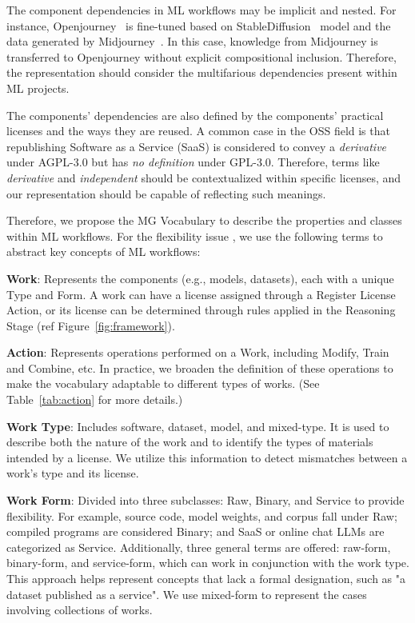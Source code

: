  The component dependencies in ML workflows may be implicit and nested. 
For instance, Openjourney~\cite{openjourney2024prompthero} is fine-tuned based on StableDiffusion~\cite{rombach2022high} model and the data generated by Midjourney~\cite{midjourney2024terms}. 
In this case, knowledge from Midjourney is transferred to Openjourney without explicit compositional inclusion. 
Therefore, the representation should consider the multifarious dependencies present within ML projects.

 The components' dependencies are also defined by the components' practical licenses and the ways they are reused. 
A common case in the OSS field is that republishing Software as a Service (SaaS) is considered to convey a \emph{derivative} under AGPL-3.0 but has \emph{no definition} under GPL-3.0. 
Therefore, terms like \emph{derivative} and \emph{independent} should be contextualized within specific licenses, and our representation should be capable of reflecting such meanings.

Therefore, we propose the MG Vocabulary to describe the properties and classes within ML workflows.
For the flexibility issue , we use the following terms to abstract key concepts of ML workflows:

\textbf{Work}: Represents the components (e.g., models, datasets), each with a unique Type and Form. 
A work can have a license assigned through a Register License Action, or its license can be determined through rules applied in the Reasoning Stage (ref Figure~\ref{fig:framework}).

\textbf{Action}: Represents operations performed on a Work, including Modify, Train and Combine, etc. 
In practice, we broaden the definition of these operations to make the vocabulary adaptable to different types of works. (See Table~\ref{tab:action} for more details.)

\textbf{Work Type}: Includes software, dataset, model, and mixed-type. It is used to describe both the nature of the work and to identify the types of materials intended by a license. 
We utilize this information to detect mismatches between a work's type and its license.

\textbf{Work Form}: Divided into three subclasses: Raw, Binary, and Service to provide flexibility. 
For example, source code, model weights, and corpus fall under Raw; compiled programs are considered Binary; and SaaS or online chat LLMs are categorized as Service.
Additionally, three general terms are offered: raw-form, binary-form, and service-form, which can work in conjunction with the work type. 
This approach helps represent concepts that lack a formal designation, such as "a dataset published as a service".
We use mixed-form to represent the cases involving collections of works.

